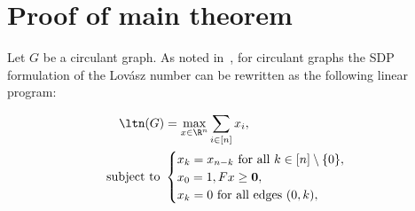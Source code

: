 
\section{Proof of main theorem}

Let $G$ be a circulant graph. As noted in~\cite{magsino2019linear}, for circulant graphs the SDP formulation of the Lovász number can be rewritten as the following linear program:

\begin{equation}
\begin{aligned}
    \ltn(G) &= \max_{x \in \R^{n}} \sum_{i \in [n]} x_i, \\ \text{ subject to }
    &\begin{cases} x_k = x_{n - k} \text{ for all } k \in [n] \setminus \{0\}, \\
    x_0 = 1,
    Fx \geq \mathbf{0}, \\
    x_k = 0\text{ for all edges } (0, k),
    \end{cases}
\end{aligned}
\end{equation}

